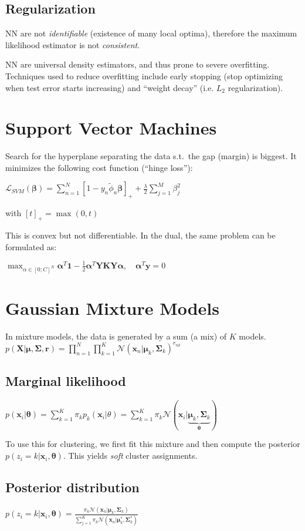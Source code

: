 \documentclass[10pt,a4paper,landscape]{article}
\renewcommand{\bf}[1]{\ensuremath{\mathbf{#1}}}
\newcommand{\balpha}{\boldsymbol\alpha}
\newcommand{\bbeta}{\boldsymbol\beta}
\newcommand{\btheta}{\boldsymbol\theta}
\newcommand{\bmu}{\boldsymbol\mu}
\newcommand{\bSigma}{\boldsymbol\Sigma}
\newcommand{\bx}{\bf{x}}
\newcommand{\st}{s.t.}
\providecommand{\gauss}[3]{\ensuremath{\mathcal{N}(#1|#2,#3)}}
\begin{document}
\begin{multicols*}{4}
\subsection{Regularization}
NN are not \textit{identifiable} (existence of many local optima), therefore the maximum likelihood estimator is not \textit{consistent}.

NN are universal density estimators, and thus prone to severe overfitting. Techniques used to reduce overfitting include early stopping (stop optimizing when test error starts increasing) and ``weight decay'' (i.e. $L_2$ regularization).

\section{Support Vector Machines}
Search for the hyperplane separating the data \st\ the gap (margin) is biggest.
It minimizes the following cost function (``hinge loss''):

$\mathcal{L}_{SVM} (\bbeta)= \sum_{n=1}^N [1 - y_n \tilde\phi_n \bbeta]_{+} + \frac{\lambda}{2} \sum_{j=1}^M \beta_j^2$

with $[t]_{+} = \max(0, t)$

This is convex but not differentiable. In the dual, the same problem can be formulated as:

$\max_{\alpha \in [0; C]^N} \balpha^T \bf{1} - \frac{1}{2} \balpha^T \bf{Y K Y} \balpha , \quad \balpha^T \bf{y} = 0$

\section{Gaussian Mixture Models}
In mixture models, the data is generated by a sum (a mix) of $K$ models. %
$p(\bf{X}|\bmu, \bf{\Sigma}, \bf{r}) = \prod_{n=1}^N\prod_{k=1}^K\mathcal{N}(\bf{x}_n|\bmu_k,\bSigma_k)^{r_{nk}}$
\subsection{Marginal likelihood}
$p(\bf{x}_i | \btheta) = \sum_{k=1}^K \pi_k p_k(\bf{x}_i | \theta) =  \sum_{k=1}^K \pi_k \mathcal{N}(\bf{x}_i | \underbrace{\bmu_k, \bf{\Sigma}_k}_{\btheta})$

To use this for clustering, we first fit this mixture and then compute the posterior $p(z_i = k | \bf{x}_i, \btheta)$. This yields \textit{soft} cluster assignments.

\subsection{Posterior distribution}
$p(z_i = k | \bx_i, \btheta) = \frac{\pi_k\gauss{\bf{x}_n}{\bmu_k}{\bSigma_k}}{\sum_{j=1}^K\pi_k\gauss{\bx_n}{\bmu_k^*}{\bSigma_k^*}}$


\end{multicols*}
\end{document}
